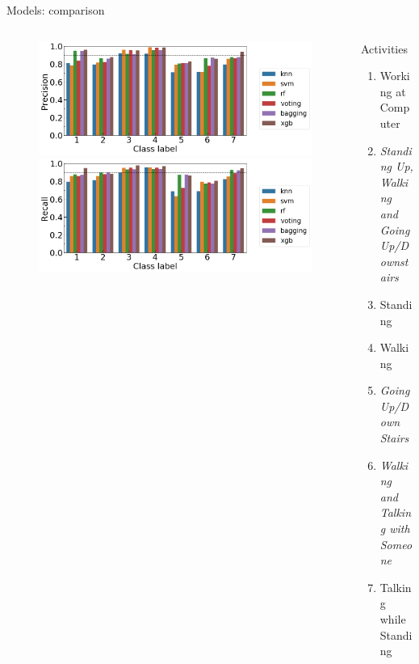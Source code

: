 \documentclass{if-beamer}
\begin{document}
  
\begin{frame}{Models:  comparison} 
  
    \begin{columns}
   \begin{column}{0.6\textwidth} 
             \begin{figure}
            \includegraphics[scale=0.19]{./figs/comparison_precision.png}
            \includegraphics[scale=0.19]{./figs/comparison_recall.png}
            \end{figure}  


   \end{column} 
    
   \begin{column}{0.4\textwidth}
   
        \begin{block}{Activities}
                            \begin{enumerate}
                            \item Working at Computer
                            \item \emph{Standing Up, Walking  and Going Up/Downstairs}
                            \item  Standing
                            \item  Walking
                            \item \emph{Going Up/Down Stairs}
                            \item  \emph{Walking and Talking with Someone}
                            \item Talking while  Standing
                    \end{enumerate}
        \end{block}
        

\end{column}
\end{columns}
\end{frame}
\end{document}
